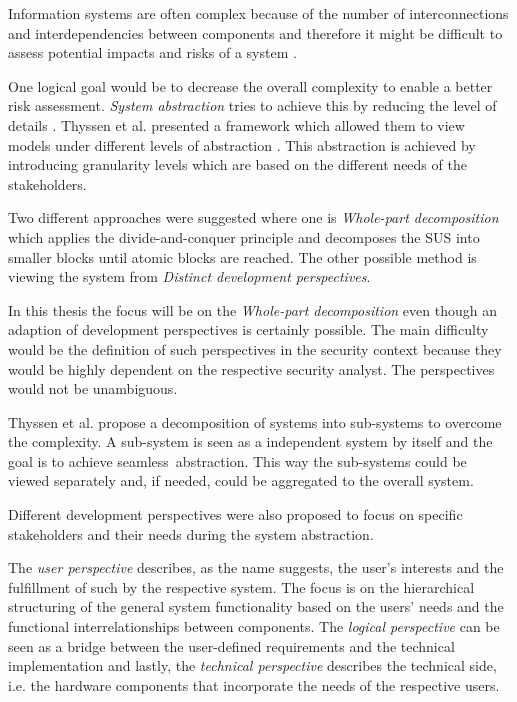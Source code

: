 Information systems are often complex because of the number of interconnections and interdependencies between components and therefore it might be difficult to assess potential impacts and risks of a system \cite{branagan}.

One logical goal would be to decrease the overall complexity to enable a better risk assessment. \textit{System abstraction} tries to achieve this by reducing the level of details \cite{branagan}. Thyssen et al. presented a framework which allowed them to view models under different levels of abstraction \cite{thyssen2010system}. This abstraction is achieved by introducing granularity levels which are based on the different needs of the stakeholders. 

Two different approaches were suggested where one is \textit{Whole-part decomposition} which applies the divide-and-conquer principle and decomposes the SUS into smaller blocks until atomic blocks are reached. The other possible method is viewing the system from \textit{Distinct development perspectives}. 

In this thesis the focus will be on the \textit{Whole-part decomposition} even though an adaption of development perspectives is certainly possible. The main difficulty would be the definition of such perspectives in the security context because they would be highly dependent on the respective security analyst. The perspectives would not be unambiguous.

Thyssen et al. propose a decomposition of systems into sub-systems to overcome the complexity. A sub-system is seen as a independent system by itself and the goal is to achieve \glqq seamless\grqq \ abstraction. This way the sub-systems could be viewed separately and, if needed, could be aggregated to the overall system.

Different development perspectives were also proposed to focus on specific stakeholders and their needs during the system abstraction. 

The \textit{user perspective} describes, as the name suggests, the user's interests and the fulfillment of such by the respective system. The focus is on the hierarchical structuring of the general system functionality based on the users' needs and the functional interrelationships between components. The \textit{logical perspective} can be seen as a bridge between the user-defined requirements and the technical implementation and lastly, the \textit{technical perspective} describes the technical side, i.e. the hardware components that incorporate the needs of the respective users.  

